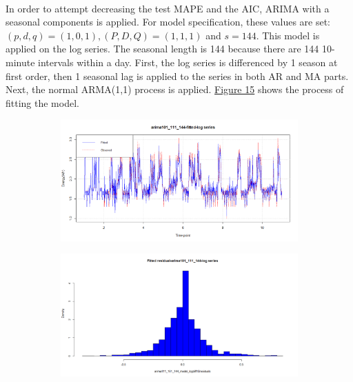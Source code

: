 \documentclass[12pt]{article}
\begin{document}
\paragraph{}
In order to attempt decreasing the test MAPE and the AIC, ARIMA with a seasonal components is applied. For model specification, these values are set: $(p,d,q)=(1,0,1), (P,D,Q)=(1,1,1)$ and $s=144$. This model is applied on the log series. The seasonal length is 144 because there are 144 10-minute intervals within a day. First, the log series is differenced by 1 season at first order, then 1 seasonal lag is applied to the series in both AR and MA parts. Next, the normal ARMA(1,1) process is applied. \href{figure15}{Figure 15} shows the process of fitting the model.
\begin{figure}[H]
  \centering
  \begin{subfigure}[b]{0.49\linewidth}
    \includegraphics[width=\linewidth]{figure15-1.png}
  \end{subfigure}
  \begin{subfigure}[b]{0.49\linewidth}
    \includegraphics[width=\linewidth]{figure15-2.png}
  \end{subfigure}
  \begin{subfigure}[b]{0.49\linewidth}

\end{subfigure}
\end{figure}
\end{document}

